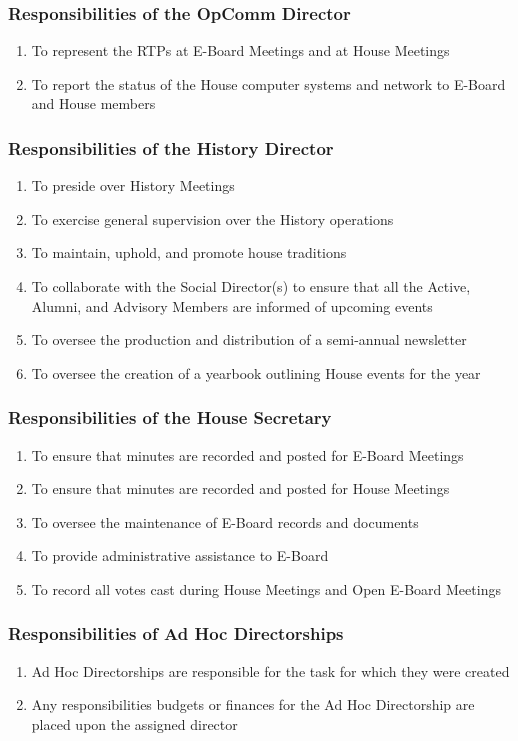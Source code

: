 \documentclass{article}
\newcommand{\asubsection}[1]{\subsubsection{#1} \label{#1}}
\begin{document}
\asubsection{Responsibilities of the OpComm Director}
\begin{enumerate}
	\item To represent the RTPs at E-Board Meetings and at House Meetings
	\item To report the status of the House computer systems and network to E-Board and House members
\end{enumerate}

\asubsection{Responsibilities of the History Director}
\begin{enumerate}
	\item To preside over History Meetings
	\item To exercise general supervision over the History operations
	\item To maintain, uphold, and promote house traditions
	\item To collaborate with the Social Director(s) to ensure that all the Active, Alumni, and Advisory Members are informed of upcoming events
	\item To oversee the production and distribution of a semi-annual newsletter
	\item To oversee the creation of a yearbook outlining House events for the year
\end{enumerate}

\asubsection{Responsibilities of the House Secretary}
\begin{enumerate}
	\item To ensure that minutes are recorded and posted for E-Board Meetings
	\item To ensure that minutes are recorded and posted for House Meetings
	\item To oversee the maintenance of E-Board records and documents
	\item To provide administrative assistance to E-Board
	\item To record all votes cast during House Meetings and Open E-Board Meetings
\end{enumerate}

\asubsection{Responsibilities of Ad Hoc Directorships}
\begin{enumerate}
	\item Ad Hoc Directorships are responsible for the task for which they were created
	\item Any responsibilities budgets or finances for the Ad Hoc Directorship are placed upon the assigned director
\end{enumerate}
\end{document}
